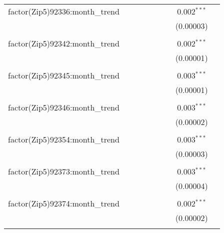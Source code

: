 \begin{table}[H]
{\begin{tabular}{@{\extracolsep{5pt}}lcccccccc}
  factor(Zip5)92336:month\_trend &  &  &  &  &  &  & 0.002$^{***}$ &  \\  

   &  &  &  &  &  &  & (0.00003) &  \\  

   & & & & & & & & \\  

  factor(Zip5)92342:month\_trend &  &  &  &  &  &  & 0.002$^{***}$ &  \\  

   &  &  &  &  &  &  & (0.00001) &  \\  

   & & & & & & & & \\  

  factor(Zip5)92345:month\_trend &  &  &  &  &  &  & 0.003$^{***}$ &  \\  

   &  &  &  &  &  &  & (0.00001) &  \\  

   & & & & & & & & \\  

  factor(Zip5)92346:month\_trend &  &  &  &  &  &  & 0.003$^{***}$ &  \\  

   &  &  &  &  &  &  & (0.00002) &  \\  

   & & & & & & & & \\  

  factor(Zip5)92354:month\_trend &  &  &  &  &  &  & 0.003$^{***}$ &  \\  

   &  &  &  &  &  &  & (0.00003) &  \\  

   & & & & & & & & \\  

  factor(Zip5)92373:month\_trend &  &  &  &  &  &  & 0.003$^{***}$ &  \\  

   &  &  &  &  &  &  & (0.00004) &  \\  

   & & & & & & & & \\  

  factor(Zip5)92374:month\_trend &  &  &  &  &  &  & 0.002$^{***}$ &  \\  

   &  &  &  &  &  &  & (0.00002) &  \\  

   & & & & & & & & \\  


\end{tabular}}
\end{table}
